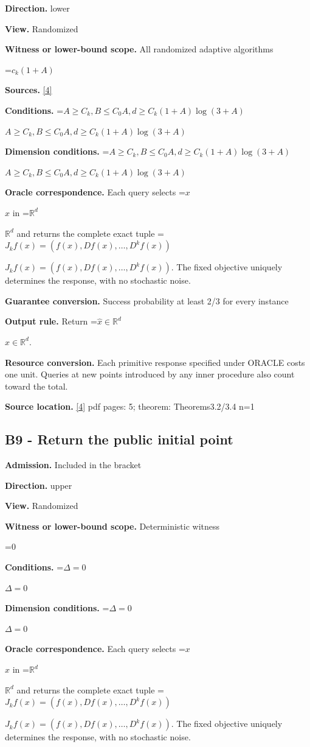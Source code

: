 \documentclass[10pt,a4paper]{article}
\newcommand{\AtlasMath}[1]{\par\begingroup\centering\setbox0=\hbox{$\displaystyle #1$}\ifdim\wd0>1.4\linewidth\typeout{ATLAS WIDE FORMULA: \the\wd0}\fi\ifdim\wd0>\linewidth\resizebox{\linewidth}{!}{\box0}\else\box0\fi\par\endgroup}
\newcommand{\AtlasInlineMath}[1]{\begingroup\setbox0=\hbox{$#1$}\ifdim\wd0>.4\linewidth\endgroup\AtlasMath{#1}\else\endgroup$#1$\fi}
\begin{document}
\textbf{Direction.} lower

\textbf{View.} Randomized

\textbf{Witness or lower-bound scope.} All randomized adaptive algorithms

\AtlasMath{c_k(1+A)}
\textbf{Sources.} \href{https://arxiv.org/abs/2609.28202}{[4]}

\textbf{Conditions.} \AtlasInlineMath{A\ge C_k,B\le C_0 A,d\ge C_k(1+A)\log(3+A)}

\textbf{Dimension conditions.} \AtlasInlineMath{A\ge C_k,B\le C_0 A,d\ge C_k(1+A)\log(3+A)}

\textbf{Oracle correspondence.} Each query selects \AtlasInlineMath{x} in \AtlasInlineMath{\mathbb{R}^d} and returns the complete exact tuple \AtlasInlineMath{J_{k}f(x)=(f(x),Df(x),\ldots,D^{k}f(x))}. The fixed objective uniquely determines the response, with no stochastic noise.

\textbf{Guarantee conversion.} Success probability at least 2/3 for every instance

\textbf{Output rule.} Return \AtlasInlineMath{\widehat{x}\in \mathbb{R}^d}.

\textbf{Resource conversion.} Each primitive response specified under ORACLE costs one unit. Queries at new points introduced by any inner procedure also count toward the total.

\textbf{Source location.} \href{https://arxiv.org/abs/2609.28202}{[4]} pdf pages: 5; theorem: Theorems3.2/3.4 n=1

\subsection{B9 - Return the public initial point}
\textbf{Admission.} Included in the bracket

\textbf{Direction.} upper

\textbf{View.} Randomized

\textbf{Witness or lower-bound scope.} Deterministic witness

\AtlasMath{0}
\textbf{Conditions.} \AtlasInlineMath{\Delta=0}

\textbf{Dimension conditions.} \AtlasInlineMath{\Delta=0}

\textbf{Oracle correspondence.} Each query selects \AtlasInlineMath{x} in \AtlasInlineMath{\mathbb{R}^d} and returns the complete exact tuple \AtlasInlineMath{J_{k}f(x)=(f(x),Df(x),\ldots,D^{k}f(x))}. The fixed objective uniquely determines the response, with no stochastic noise.
\end{document}
